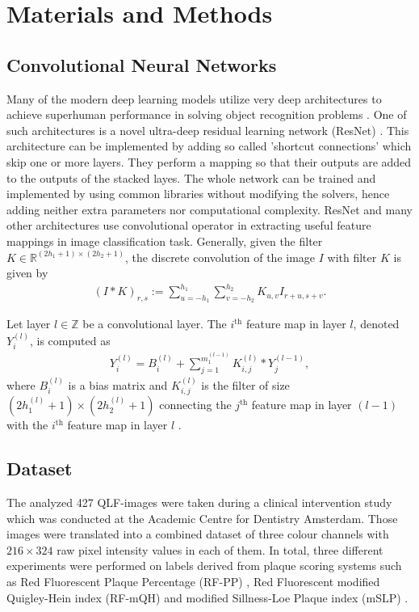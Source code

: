 \documentclass[runningheads,a4paper]{llncs}
\begin{document}
\section{Materials and Methods}
\subsection{Convolutional Neural Networks}
Many of the modern deep learning models utilize very deep architectures to achieve superhuman performance in solving object recognition problems \cite{simonyan2014very,szegedy2015going}. One of such architectures is a novel ultra-deep residual learning network (ResNet) \cite{he2016deep}. This architecture can be implemented by adding so called 'shortcut connections' \cite{he2016identity} which skip one or more layers. They perform a mapping so that their outputs are added to the outputs of the stacked layes. The whole network can be trained and implemented by using common libraries without modifying the solvers, hence adding neither extra parameters nor computational complexity. ResNet and many other architectures \cite{jarrett2009best,lecun2010convolutional} use convolutional operator in extracting useful feature mappings in image classification task. Generally, given the filter $K \in \mathbb{R}^{(2h_1+1) \times (2h_2+1)}$, the discrete convolution of the image $I$ with filter $K$ is given by
\begin{align}
	\label{eq:convolution}
	\left(I \ast K\right)_{r,s} := \sum _{u = -h_1} ^{h_1} \sum _{v = -h_2}^{h_2} K_{u,v} I_{r+u,s+v}.
\end{align}

Let layer $l \in \mathbb{Z}$ be a convolutional layer. The $i^{\text{th}}$ feature map in layer $l$, denoted $Y_i^{(l)}$, is computed as
\begin{align}
	\label{eq:convolutional-layer}
	Y_i^{(l)} = B^{(l)}_{i} + \sum _{j = 1}^{m_1^{(l-1)}} K^{(l)}_{i,j} \ast Y_j^{(l-1)},
\end{align}
where $B_i^{(l)}$ is a bias matrix and $K^{(l)}_{i,j}$ is the filter of size $(2h_1^{(l)} + 1) \times (2h_2^{(l)} + 1)$ connecting the $j^{\text{th}}$ feature map in layer $(l-1)$ with the $i^{\text{th}}$ feature map in layer $l$ \cite{lecun2010convolutional}.

\subsection{Dataset}
The analyzed 427 QLF-images were taken during a clinical intervention study \cite{van2016dynamics} which was conducted at the Academic Centre for Dentistry Amsterdam. Those images were translated into a combined dataset of three colour channels with $216\times324$ raw pixel intensity values in each of them. In total, three different experiments were performed on labels derived from plaque scoring systems such as Red Fluorescent Plaque Percentage (RF-PP) \cite{van2016dynamics}, Red Fluorescent modified Quigley-Hein index (RF-mQH) \cite{volgenant2016comparison} and modified Sillness-Loe Plaque index (mSLP) \cite{weijden1993comparative}.
\end{document}
